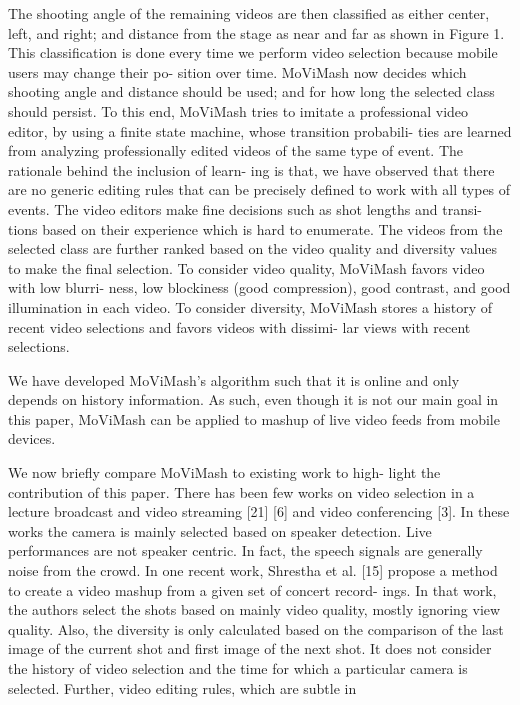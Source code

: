\documentclass{sig-alternate}
\begin{document}
The shooting angle of the remaining videos are then classified as
either center, left, and right; and distance from the stage as near and
far as shown in Figure 1. This classification is done every time we
perform video selection because mobile users may change their po-
sition over time. MoViMash now decides which shooting angle and
distance should be used; and for how long the selected class should
persist. To this end, MoViMash tries to imitate a professional video
editor, by using a finite state machine, whose transition probabili-
ties are learned from analyzing professionally edited videos of the
same type of event. The rationale behind the inclusion of learn-
ing is that, we have observed that there are no generic editing rules
that can be precisely defined to work with all types of events. The
video editors make fine decisions such as shot lengths and transi-
tions based on their experience which is hard to enumerate.
The videos from the selected class are further ranked based on
the video quality and diversity values to make the final selection.
To consider video quality, MoViMash favors video with low blurri-
ness, low blockiness (good compression), good contrast, and good
illumination in each video. To consider diversity, MoViMash stores
a history of recent video selections and favors videos with dissimi-
lar views with recent selections.\par
We have developed MoViMash’s algorithm such that it is online
and only depends on history information. As such, even though
it is not our main goal in this paper, MoViMash can be applied to
mashup of live video feeds from mobile devices.\par
We now briefly compare MoViMash to existing work to high-
light the contribution of this paper. There has been few works on
video selection in a lecture broadcast and video streaming [21] [6]
and video conferencing [3]. In these works the camera is mainly
selected based on speaker detection. Live performances are not
speaker centric. In fact, the speech signals are generally noise from
the crowd. In one recent work, Shrestha et al. [15] propose a
method to create a video mashup from a given set of concert record-
ings. In that work, the authors select the shots based on mainly
video quality, mostly ignoring view quality. Also, the diversity is
only calculated based on the comparison of the last image of the
current shot and first image of the next shot. It does not consider
the history of video selection and the time for which a particular
camera is selected. Further, video editing rules, which are subtle in
\end{document}
